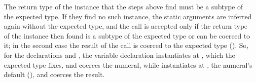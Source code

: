 The return type of the instance that the steps above find must be a subtype of
the expected type.
If they find no such instance, the static arguments are inferred again without
the expected type, and the call is accepted only if the return type of the instance
then found is a subtype of the expected type or can be coerced to it; in the
second case the result of the call is coerced to the expected type
().
So, for the declarations
and ,
the variable declaration 
instantiates  at , which the expected type fixes,
and coerces the numeral, while 
instantiates  at , the numeral's default
(), and coerces the result.

